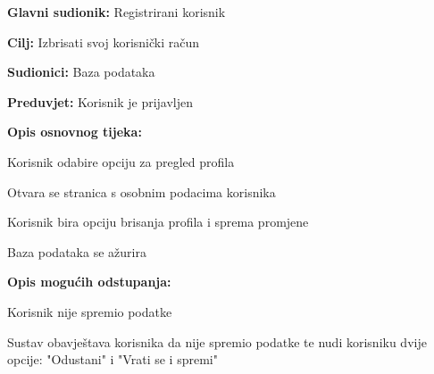 				\noindent {}
					\begin{packed_item}
	
						\item \textbf{Glavni sudionik: }Registrirani korisnik
						\item  \textbf{Cilj:} Izbrisati svoj korisnički račun
						\item  \textbf{Sudionici:} Baza podataka
						\item  \textbf{Preduvjet:} Korisnik je prijavljen
						\item  \textbf{Opis osnovnog tijeka:}
						
						\item[] \begin{packed_enum}
	
							\item Korisnik odabire opciju za pregled profila
							\item Otvara se stranica s osobnim podacima korisnika
							\item Korisnik bira opciju brisanja profila i sprema promjene
							\item Baza podataka se ažurira

						\end{packed_enum}
						
						\item  \textbf{Opis mogućih odstupanja:}
						
						\item[] \begin{packed_item}
								
							\item[3.a] Korisnik nije spremio podatke
								\begin{packed_item}
									\item Sustav obavještava korisnika da nije spremio podatke te nudi korisniku dvije opcije: "Odustani" i "Vrati se i spremi"
								\end{packed_item}
								
								
						\end{packed_item}						
					\end{packed_item}
					

